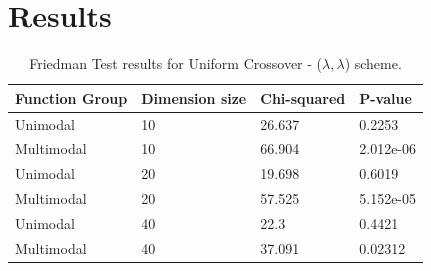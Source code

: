 \section{Results}\label{sec:results}

\begin{table}[h]
	\centering
	\begin{tabular}{|l|l|l|l|}
		\hline
		\textbf{Function Group} & \textbf{Dimension size}      & \textbf{Chi-squared}        & \textbf{P-value}                     \\ \hline
		\multicolumn{1}{|l|}{Unimodal} & \multicolumn{1}{|l|}{10} & \multicolumn{1}{l|}{26.637} & \multicolumn{1}{l|}{0.2253} \\ \hline
		\multicolumn{1}{|l|}{Multimodal} & \multicolumn{1}{|l|}{10} & \multicolumn{1}{l|}{66.904} & \multicolumn{1}{l|}{2.012e-06}  \\ \hline
		\hline
		\multicolumn{1}{|l|}{Unimodal} & \multicolumn{1}{|l|}{20} & \multicolumn{1}{l|}{19.698} & \multicolumn{1}{l|}{0.6019} \\ \hline
		\multicolumn{1}{|l|}{Multimodal} & \multicolumn{1}{|l|}{20} & \multicolumn{1}{l|}{57.525} & \multicolumn{1}{l|}{5.152e-05}  \\ \hline
		\hline	
		\multicolumn{1}{|l|}{Unimodal} & \multicolumn{1}{|l|}{40} & \multicolumn{1}{l|}{22.3} & \multicolumn{1}{l|}{0.4421} \\ \hline
		\multicolumn{1}{|l|}{Multimodal} & \multicolumn{1}{|l|}{40} & \multicolumn{1}{l|}{37.091} & \multicolumn{1}{l|}{0.02312}  \\ \hline
	\end{tabular}
	\caption{Friedman Test results for Uniform Crossover - ($\lambda, \lambda$) scheme.}
	\label{Friedman_test_uniform-a}	
\end{table}


